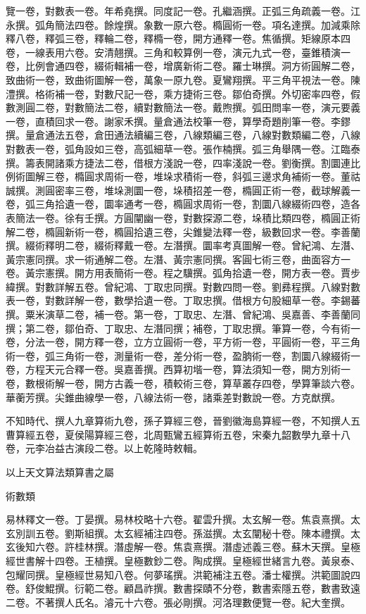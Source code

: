 \begin{pinyinscope}
覽一卷，對數表一卷。年希堯撰。同度記一卷。孔繼涵撰。正弧三角疏義一卷。江永撰。弧角簡法四卷。餘煌撰。象數一原六卷。橢圓術一卷。項名達撰。加減乘除釋八卷，釋弧三卷，釋輪二卷，釋橢一卷，開方通釋一卷。焦循撰。矩線原本四卷，一線表用六卷。安清翹撰。三角和較算例一卷，演元九式一卷，臺錐積演一卷，比例會通四卷，綴術輯補一卷，增廣新術二卷。羅士琳撰。洞方術圓解二卷，致曲術一卷，致曲術圖解一卷，萬象一原九卷。夏鸞翔撰。平三角平視法一卷。陳澧撰。格術補一卷，對數尺記一卷，乘方捷術三卷。鄒伯奇撰。外切密率四卷，假數測圓二卷，對數簡法二卷，續對數簡法一卷。戴煦撰。弧田問率一卷，演元要義一卷，直積回求一卷。謝家禾撰。量倉通法校筆一卷，算學奇題削筆一卷。李鏐撰。量倉通法五卷，倉田通法續編三卷，八線類編三卷，八線對數類編二卷，八線對數表一卷，弧角設如三卷，高弧細草一卷。張作楠撰。弧三角舉隅一卷。江臨泰撰。籌表開諸乘方捷法二卷，借根方淺說一卷，四率淺說一卷。劉衡撰。割圜連比例術圖解三卷，橢圓求周術一卷，堆垛求積術一卷，斜弧三邊求角補術一卷。董祜誠撰。測圓密率三卷，堆垛測圜一卷，垛積招差一卷，橢圓正術一卷，截球解義一卷，弧三角拾遺一卷，圜率通考一卷，橢圓求周術一卷，割圜八線綴術四卷，造各表簡法一卷。徐有壬撰。方圓闡幽一卷，對數探源二卷，垛積比類四卷，橢圓正術解二卷，橢圓新術一卷，橢圓拾遺三卷，尖錐變法釋一卷，級數回求一卷。李善蘭撰。綴術釋明二卷，綴術釋戴一卷。左潛撰。圜率考真圖解一卷。曾紀鴻、左潛、黃宗憲同撰。求一術通解二卷。左潛、黃宗憲同撰。客圓七術三卷，曲面容方一卷。黃宗憲撰。開方用表簡術一卷。程之驥撰。弧角拾遺一卷，開方表一卷。賈步緯撰。對數詳解五卷。曾紀鴻、丁取忠同撰。對數四問一卷。劉彞程撰。八線對數表一卷，對數詳解一卷，數學拾遺一卷。丁取忠撰。借根方句股細草一卷。李錫蕃撰。粟米演草二卷，補一卷。第一卷，丁取忠、左潛、曾紀鴻、吳嘉善、李善蘭同撰；第二卷，鄒伯奇、丁取忠、左潛同撰；補卷，丁取忠撰。筆算一卷，今有術一卷，分法一卷，開方釋一卷，立方立圓術一卷，平方術一卷，平圓術一卷，平三角術一卷，弧三角術一卷，測量術一卷，差分術一卷，盈朒術一卷，割圜八線綴術一卷，方程天元合釋一卷。吳嘉善撰。西算初堦一卷，算法須知一卷，開方別術一卷，數根術解一卷，開方古義一卷，積較術三卷，算草叢存四卷，學算筆談六卷。華蘅芳撰。尖錐曲線學一卷，八線法術一卷，諸乘差對數說一卷。方克猷撰。

不知時代、撰人九章算術九卷，孫子算經三卷，晉劉徽海島算經一卷，不知撰人五曹算經五卷，夏侯陽算經三卷，北周甄鸞五經算術五卷，宋秦九韶數學九章十八卷，元李冶益古演段二卷。以上乾隆時敕輯。

以上天文算法類算書之屬

術數類

易林釋文一卷。丁晏撰。易林校略十六卷。翟雲升撰。太玄解一卷。焦袁熹撰。太玄別訓五卷。劉斯組撰。太玄經補注四卷。孫滋撰。太玄闡秘十卷。陳本禮撰。太玄後知六卷。許桂林撰。潛虛解一卷。焦袁熹撰。潛虛述義三卷。蘇木天撰。皇極經世書解十四卷。王植撰。皇極數鈔二卷。陶成撰。皇極經世緒言九卷。黃泉泰、包耀同撰。皇極經世易知八卷。何夢瑤撰。洪範補注五卷。潘士權撰。洪範圖說四卷。舒俊鯤撰。衍範二卷。顧昌祚撰。數書探賾不分卷，數書索隱五卷，數書致遠二卷。不著撰人氏名。濬元十六卷。張必剛撰。河洛理數便覽一卷。紀大奎撰。


\end{pinyinscope}
